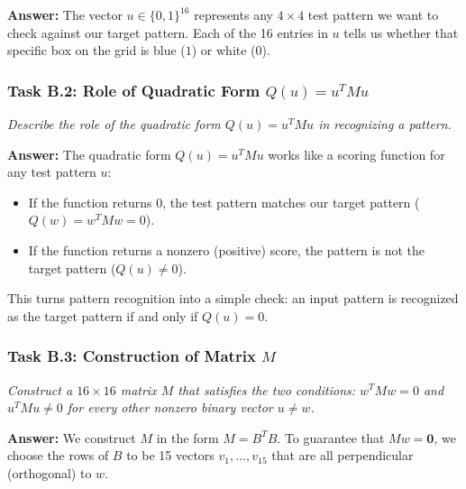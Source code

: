 \documentclass[11pt]{article}
\begin{document}
\vspace{0.4em}
\textbf{Answer:}
The vector $u \in \{0, 1\}^{16}$ represents any $4 \times 4$ test pattern we want to check against our target pattern. Each of the 16 entries in $u$ tells us whether that specific box on the grid is blue ($1$) or white ($0$).

\vspace{0.8em}

\subsubsection*{Task B.2: Role of Quadratic Form $Q(u) = u^T M u$}
\textit{Describe the role of the quadratic form $Q(u) = u^T M u$ in recognizing a pattern.}

\vspace{0.4em}
\textbf{Answer:}
The quadratic form $Q(u) = u^T M u$ works like a scoring function for any test pattern $u$:
\begin{itemize}
    \item If the function returns $0$, the test pattern matches our target pattern ($Q(w) = w^T M w = 0$).
    \item If the function returns a nonzero (positive) score, the pattern is not the target pattern ($Q(u) \neq 0$).
\end{itemize}
This turns pattern recognition into a simple check: an input pattern is recognized as the target pattern if and only if $Q(u) = 0$.

\vspace{0.5em}

\subsubsection*{Task B.3: Construction of Matrix $M$}
\textit{Construct a $16 \times 16$ matrix $M$ that satisfies the two conditions: $w^T M w = 0$ and $u^T M u \neq 0$ for every other nonzero binary vector $u \neq w$.}

\vspace{0.4em}
\textbf{Answer:}
We construct $M$ in the form $M = B^T B$. To guarantee that $M w = \mathbf{0}$, we choose the rows of $B$ to be 15 vectors $v_1, \dots, v_{15}$ that are all perpendicular (orthogonal) to $w$.
\end{document}
